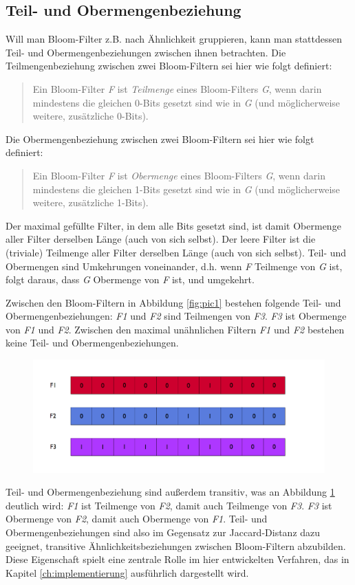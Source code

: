 \subsection{Teil- und Obermengenbeziehung}\label{sec:mengenbeziehungen}
Will man Bloom-Filter z.B. nach Ähnlichkeit gruppieren, kann man stattdessen Teil- und Obermengenbeziehungen zwischen ihnen betrachten. Die Teilmengenbeziehung zwischen zwei Bloom-Filtern sei hier wie folgt definiert: 
\begin{quote}
Ein Bloom-Filter \textit{F} ist \textit{Teilmenge} eines Bloom-Filters \textit{G}, wenn darin mindestens die gleichen 0-Bits gesetzt sind wie in \textit{G} (und möglicherweise weitere, zusätzliche 0-Bits).
\end{quote}
Die Obermengenbeziehung zwischen zwei Bloom-Filtern sei hier wie folgt definiert: 
\begin{quote}
Ein Bloom-Filter \textit{F} ist \textit{Obermenge} eines Bloom-Filters \textit{G}, wenn darin mindestens die gleichen 1-Bits gesetzt sind wie in \textit{G} (und möglicherweise weitere, zusätzliche 1-Bits).
\end{quote}
Der maximal gefüllte Filter, in dem alle Bits gesetzt sind, ist damit Obermenge aller Filter derselben Länge (auch von sich selbst). Der leere Filter ist die (triviale) Teilmenge aller Filter derselben Länge (auch von sich selbst). Teil- und Obermengen sind Umkehrungen voneinander, d.h. wenn \textit{F} Teilmenge von \textit{G} ist, folgt daraus, dass \textit{G} Obermenge von \textit{F} ist, und umgekehrt.  

Zwischen den Bloom-Filtern in Abbildung \ref{fig:pic1} bestehen folgende Teil- und Obermengenbeziehungen: \textit{F1} und \textit{F2} sind Teilmengen von \textit{F3}. \textit{F3} ist Obermenge von \textit{F1} und \textit{F2}. Zwischen den maximal unähnlichen Filtern \textit{F1} und \textit{F2} bestehen keine Teil- und Obermengenbeziehungen. 
\begin{figure}[hpbt]
  \centering
  \label{fig:pic2}
  \includegraphics[width=1.0\textwidth]{pictures/distances.png}
\end{figure}
Teil- und Obermengenbeziehung sind außerdem transitiv, was an Abbildung \ref{fig:pic2} deutlich wird: \textit{F1} ist Teilmenge von \textit{F2}, damit auch Teilmenge von \textit{F3}. \textit{F3} ist Obermenge von \textit{F2}, damit auch Obermenge von \textit{F1}. Teil- und Obermengenbeziehungen sind also im Gegensatz zur Jaccard-Distanz dazu geeignet, transitive Ähnlichkeitsbeziehungen zwischen Bloom-Filtern abzubilden. Diese Eigenschaft spielt eine zentrale Rolle im hier entwickelten Verfahren, das in Kapitel \ref{ch:implementierung} ausführlich dargestellt wird. 
